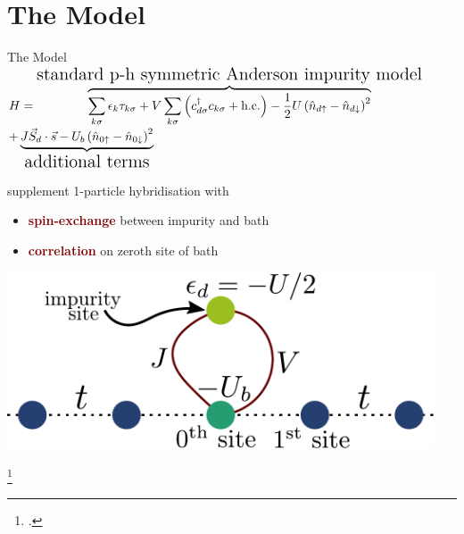 \documentclass[aspectratio=169]{beamer}
\newcommand{\focus}[1]{\textcolor{maroon}{\textbf{#1}}}
\begin{document}
\section{The Model}
\begin{frame}[noframenumbering]{The Model}
\centering
	{\Large\(H = \overbrace{\sum_{k\sigma}\epsilon_k \tau_{k\sigma} + V \sum_{k\sigma}\left(c^\dagger_{d\sigma}c_{k\sigma} + \text{h.c.}\right)  - \frac{1}{2}U \left(\hat n_{d \uparrow} - \hat n_{d \downarrow}\right)^2}^\text{\Large standard p-h symmetric Anderson impurity model}\)\\
	\(+ \underbrace{J \vec{S}_d\cdot\vec{s} - U_b \left(\hat n_{0 \uparrow} - \hat n_{0 \downarrow}\right)^2}_\text{\Large additional terms}\)}

\vspace*{\fill}
\hspace*{-20pt}
\begin{minipage}{0.5\textwidth}
supplement 1-particle hybridisation with 
\begin{itemize}
	\item \focus{spin-exchange} between impurity and bath
	\item \focus{correlation} on zeroth site of bath
\end{itemize}
\end{minipage}
\begin{minipage}{0.5\textwidth}
\hspace*{20pt}
\includegraphics[width=0.95\textwidth]{figures/gen_siam.pdf}
\end{minipage}

\footcite{Schrieffer_Wolff,anderson_impurity_1961}

\end{frame}
\end{document}
